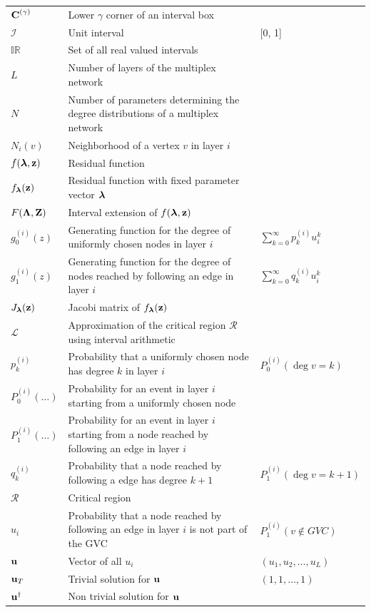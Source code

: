 \documentclass[
11pt, %
american, %
singlespacing, %
final, %
nolistspacing, %
liststotoc, %
headsepline, %
]{MastersDoctoralThesis} %
\begin{document}
{\begin{longtable}{m{}m{}m{}}
$\boldsymbol{\mathrm{C}}^{(\gamma)}$		& Lower $\gamma$ corner of an interval box \\
$\mathcal{I}$		& Unit interval & [0, 1] \\
$\mathbb{IR}$		& Set of all real valued intervals \\
$L$ 				& Number of layers of the multiplex network \\
$N$					& Number of parameters determining the degree distributions of a multiplex network \\
$N_i(v)$ 			& Neighborhood of a vertex $v$ in layer $i$ \\
$f(\boldsymbol{\mathrm{\lambda}}, \boldsymbol{\mathrm{z}})$ & Residual function \\
$f_{\boldsymbol{\mathrm{\lambda}}}(\boldsymbol{\mathrm{z}})$		& Residual function with fixed parameter vector $\boldsymbol{\mathrm{\lambda}}$ \\
$F(\boldsymbol{\mathrm{\Lambda}}, \boldsymbol{\mathrm{Z}})$ 	& Interval extension of $f(\boldsymbol{\mathrm{\lambda}}, \boldsymbol{\mathrm{z}})$ \\
$g^{(i)}_0(z)$		& Generating function for the degree of uniformly chosen nodes in layer $i$ & $\sum_{k=0}^\infty p^{(i)}_k u_i^k$ \\
$g^{(i)}_1(z)$		& Generating function for the degree of nodes reached by following an edge in layer $i$ & $\sum_{k=0}^\infty q^{(i)}_k u_i^k$ \\
$J_{\boldsymbol{\mathrm{\lambda}}}(\boldsymbol{\mathrm{z}})$					& Jacobi matrix of $f_{\boldsymbol{\mathrm{\lambda}}}(\boldsymbol{\mathrm{z}})$ \\
$\mathcal{L}$	& Approximation of the critical region $\mathcal{R}$ using interval arithmetic \\
$p^{(i)}_k$			& Probability that a uniformly chosen node has degree $k$ in layer $i$ & $P^{(i)}_0(\deg{v} = k)$ \\
$P^{(i)}_0(\dots)$	& Probability for an event in layer $i$ starting from a uniformly chosen node  \\
$P^{(i)}_1(\dots)$	& Probability for an event in layer $i$ starting from a node reached by following an edge in layer $i$ \\
$q^{(i)}_k$		& Probability that a node reached by following a edge has degree $k + 1$ & $P^{(i)}_1(\deg{v} = k + 1)$ \\
$\mathcal{R}$	& Critical region \\
$u_i$			& Probability that a node reached by following an edge in layer $i$ is not part of the GVC & $P^{(i)}_1(v \notin GVC)$ \\
$\boldsymbol{\mathrm{u}}$			& Vector of all $u_i$ & $(u_1, u_2, \dots, u_L)$ \\
$\boldsymbol{\mathrm{u}}_T$		& Trivial solution for $\boldsymbol{\mathrm{u}}$ & $(1, 1, \dots, 1)$ \\
$\boldsymbol{\mathrm{u}}^\dagger$	& Non trivial solution for $\boldsymbol{\mathrm{u}}$  \\


\end{longtable}}
\end{document}

